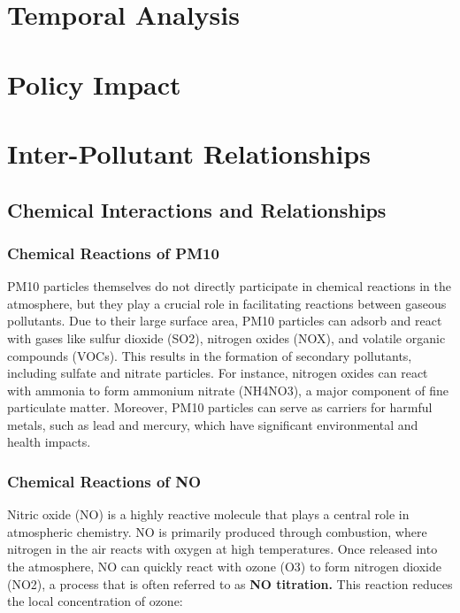 \documentclass{modeleRapport}
\begin{document}
\section{Temporal Analysis}


\section{Policy Impact}


\section{Inter-Pollutant Relationships}

\subsection{Chemical Interactions and Relationships}

\subsubsection{Chemical Reactions of PM10}

PM10 particles themselves do not directly participate in chemical reactions in the atmosphere, but they play a crucial 
role in facilitating reactions between gaseous pollutants. Due to their large surface area, PM10 particles can adsorb 
and react with gases like sulfur dioxide (SO2), nitrogen oxides (NOX), and volatile organic compounds (VOCs). 
This results in the formation of secondary pollutants, including sulfate and nitrate particles. For instance, 
nitrogen oxides can react with ammonia to form ammonium nitrate (NH4NO3), a major component of fine particulate matter. 
Moreover, PM10 particles can serve as carriers for harmful metals, such as lead and mercury, which have significant 
environmental and health impacts.\\

\subsubsection{Chemical Reactions of NO}

Nitric oxide (NO) is a highly reactive molecule that plays a central role in atmospheric chemistry. NO is primarily 
produced through combustion, where nitrogen in the air reacts with oxygen at high temperatures. Once released into 
the atmosphere, NO can quickly react with ozone (O3) to form nitrogen dioxide (NO2), a process that is often referred to as 
\textbf{NO titration.} This reaction reduces the local concentration of ozone:
\end{document}
